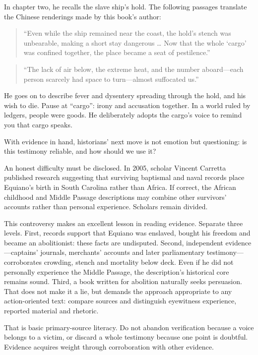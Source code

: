 In chapter two, he recalls the slave ship's hold. The following passages translate the Chinese renderings made by this book's author:

\begin{quote}
``Even while the ship remained near the coast, the hold's stench was unbearable, making a short stay dangerous \ldots{} Now that the whole `cargo' was confined together, the place became a seat of pestilence.''
\end{quote}
\begin{quote}
``The lack of air below, the extreme heat, and the number aboard---each person scarcely had space to turn---almost suffocated us.''
\end{quote}
He goes on to describe fever and dysentery spreading through the hold, and his wish to die. Pause at ``cargo'': irony and accusation together. In a world ruled by ledgers, people were goods. He deliberately adopts the cargo's voice to remind you that cargo speaks.

With evidence in hand, historians' next move is not emotion but questioning: is this testimony reliable, and how should we use it?

An honest difficulty must be disclosed. In 2005, scholar Vincent Carretta published research suggesting that surviving baptismal and naval records place Equiano's birth in South Carolina rather than Africa. If correct, the African childhood and Middle Passage descriptions may combine other survivors' accounts rather than personal experience. Scholars remain divided.

This controversy makes an excellent lesson in reading evidence. Separate three levels. First, records support that Equiano was enslaved, bought his freedom and became an abolitionist: these facts are undisputed. Second, independent evidence---captains' journals, merchants' accounts and later parliamentary testimony---corroborates crowding, stench and mortality below deck. Even if he did not personally experience the Middle Passage, the description's historical core remains sound. Third, a book written for abolition naturally seeks persuasion. That does not make it a lie, but demands the approach appropriate to any action-oriented text: compare sources and distinguish eyewitness experience, reported material and rhetoric.

That is basic primary-source literacy. Do not abandon verification because a voice belongs to a victim, or discard a whole testimony because one point is doubtful. Evidence acquires weight through corroboration with other evidence.

